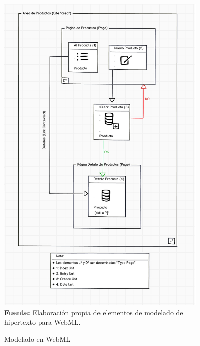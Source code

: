 \documentclass[oneside,12pt,a4paper]{memoir}%
\begin{document}
\begin{itemize}
        \begin{figure}[here]
        	\centering
        	\caption{Modelado en WebML}
			\includegraphics[width=0.9\textwidth]{figure/fig_ModelingWebML.png}
			\newline
			\textbf{Fuente:} Elaboraci\'on propia de elementos de modelado de hipertexto
			para WebML.	
			\label{fig:ModelingWebML} 
        \end{figure}
        

\end{itemize}
\end{document}
